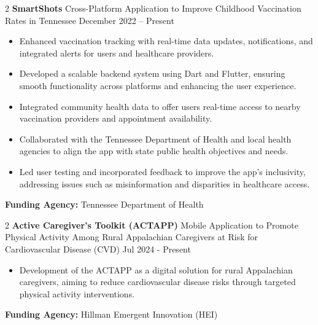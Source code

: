 \documentclass[10pt, letterpaper]{article}
\newenvironment{highlights}{
    \begin{itemize}[
        topsep=0.10 cm,
        parsep=0.10 cm,
        partopsep=0pt,
        itemsep=0pt,
        leftmargin=0 cm + 10pt
    ]
}{
    \end{itemize}
} %
\newenvironment{twocolentry}[2][]{
    \onecolentry
    \def\secondColumn{#2}
    \setcolumnwidth{\fill, 4.5 cm}
    \begin{paracol}{2}
}{
    \switchcolumn \raggedleft \secondColumn
    \end{paracol}
    \endonecolentry
} %
\begin{document}
\vspace{0.3cm} \begin{twocolentry}{December 2022 – Present} \textbf{SmartShots} \textbar Cross-Platform Application to Improve Childhood Vaccination Rates in Tennessee \end{twocolentry} \begin{highlights} \item Enhanced vaccination tracking with real-time data updates, notifications, and integrated alerts for users and healthcare providers. \item Developed a scalable backend system using Dart and Flutter, ensuring smooth functionality across platforms and enhancing the user experience. \item Integrated community health data to offer users real-time access to nearby vaccination providers and appointment availability. \item Collaborated with the Tennessee Department of Health and local health agencies to align the app with state public health objectives and needs. \item Led user testing and incorporated feedback to improve the app’s inclusivity, addressing issues such as misinformation and disparities in healthcare access. \end{highlights} \vspace{0.3cm} \noindent \textbf{Funding Agency:} Tennessee Department of Health

\vspace{0.3cm} \begin{twocolentry}{Jul 2024 - Present} \textbf{Active Caregiver’s Toolkit (ACTAPP)} \textbar Mobile Application to Promote Physical Activity Among Rural Appalachian Caregivers at Risk for Cardiovascular Disease (CVD) \end{twocolentry} \begin{highlights} \item Development of the ACTAPP as a digital solution for rural Appalachian caregivers, aiming to reduce cardiovascular disease risks through targeted physical activity interventions. 
\end{highlights} \vspace{0.3cm} \noindent \textbf{Funding Agency:} Hillman Emergent Innovation (HEI)
\end{document}
